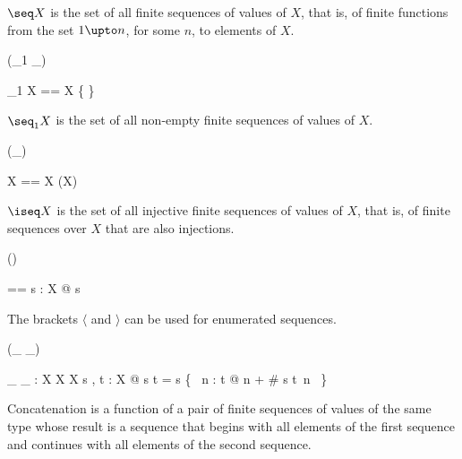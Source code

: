 \documentclass[draft,a4paper,10pt,wd]{isov2}
\begin{document}
$\seq X$ is the set of all finite sequences of values of $X$,
that is, of finite functions from the set $1 \upto n$,
for some $n$, to elements of $X$.


\begin{zed}
\generic (\seq_1 \_)
\end{zed}

\begin{zed}
\seq_1 X == \seq X \setminus \{ \emptyset \}
\end{zed}

$\seq_1 X$ is the set of all non-empty finite sequences of values of $X$.


\begin{zed}
\generic (\iseq \_)
\end{zed}

\begin{zed}
\iseq X == \seq X \cap (\nat \pinj X)
\end{zed}

$\iseq X$ is the set of all injective finite sequences of values of $X$,
that is, of finite sequences over $X$ that are also injections.


\begin{zed}
\function (\langle \listarg \rangle)
\end{zed}

\begin{zed}
\langle \listarg \rangle [ X ] == \lambda s : \seq X @ s
\end{zed}

The brackets $\langle$ and $\rangle$ can be used for enumerated sequences.


\begin{zed}
 \leftassoc (\_ \cat \_)
\end{zed}

\begin{gendef}[X]
\_ \cat \_ : \seq X \cross \seq X \fun \seq X
\where
\forall s , t : \seq X @
s \cat t = s \cup \{~ n : \dom t @ n + \# s \mapsto t~n ~\}
\end{gendef}

Concatenation is a function of a pair of finite sequences of
values of the same type whose result is a sequence that
begins with all elements of the first sequence and
continues with all elements of the second sequence.
\end{document}
